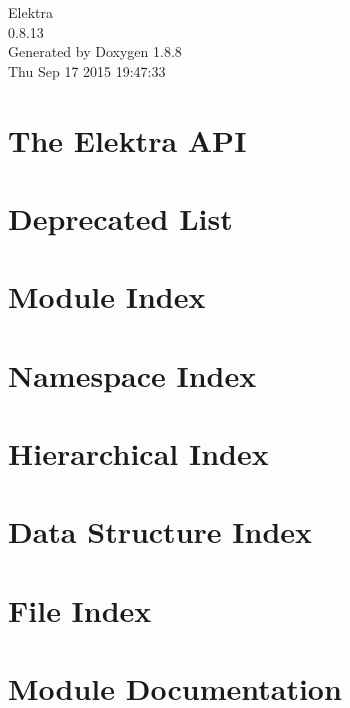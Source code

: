 \documentclass[twoside]{book}
\newcommand{\+}{\discretionary{\mbox{\scriptsize$\hookleftarrow$}}{}{}}
\newcommand{\clearemptydoublepage}{%
  \newpage{\pagestyle{empty}\cleardoublepage}%
}
\begin{document}
\hypersetup{pageanchor=false,
             bookmarks=true,
             bookmarksnumbered=true,
             pdfencoding=unicode
            }
\begin{titlepage}
\vspace*{7cm}
\begin{center}%
{\Large Elektra \\[1ex]\large 0.\+8.\+13 }\\
\vspace*{1cm}
{\large Generated by Doxygen 1.8.8}\\
\vspace*{0.5cm}
{\small Thu Sep 17 2015 19:47:33}\\
\end{center}
\end{titlepage}
\clearemptydoublepage
\tableofcontents
\clearemptydoublepage
{}
\hypersetup{pageanchor=true}

\chapter{The Elektra A\+P\+I}
\label{index}\hypertarget{index}{}
\chapter{Deprecated List}
\label{deprecated}
\hypertarget{deprecated}{}

\chapter{Module Index}

\chapter{Namespace Index}

\chapter{Hierarchical Index}

\chapter{Data Structure Index}

\chapter{File Index}

\chapter{Module Documentation}











\end{document}
